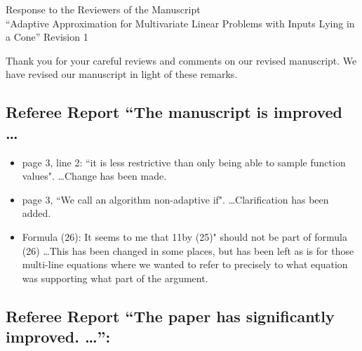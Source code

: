 \documentclass[11pt]{article}
\newcommand{\Response}[1]{{\color{blue}#1}}
\begin{document}
\begin{center}
 
{\Large Response to the Reviewers of the Manuscript\\
``Adaptive Approximation for Multivariate Linear Problems with Inputs Lying in a Cone''\quad
Revision 1}
\end{center}

\medskip

\noindent Thank you for your careful reviews and comments on our revised manuscript. We have revised our manuscript in light of these remarks.

\subsection*{Referee Report ``The manuscript is improved \ldots}

\begin{itemize}

\item page 3, line 2: ``it is less restrictive than only being able to
sample function values". \ldots  \Response{Change has been made.}

\item page 3, ``We call an algorithm non-adaptive if". \ldots \Response{Clarification has been added.}

\item Formula (26):  It seems to me that 11by (25)" should not be part
of formula (26) \ldots  \Response{This has been changed in some places, but has been left as is for those multi-line equations where we wanted to refer to precisely to what equation was supporting what part of the argument.}
\end{itemize}



\subsection*{Referee Report ``The paper has significantly improved.  \ldots'':}
\end{document}
